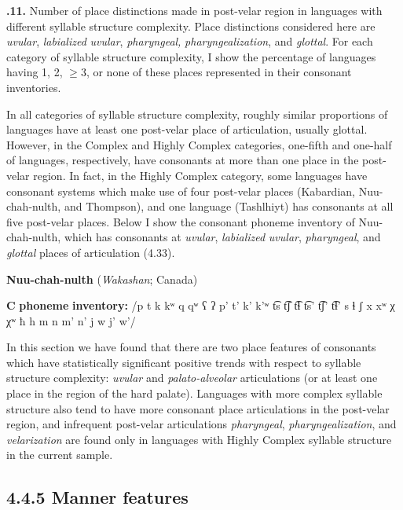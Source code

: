 \textbf{.11.} Number of place distinctions made in post-velar region in languages with different syllable structure complexity. Place distinctions considered here are \textit{uvular}, \textit{labialized} \textit{uvular}, \textit{pharyngeal,} \textit{pharyngealization}, and \textit{glottal}. For each category of syllable structure complexity, I show the percentage of languages having 1, 2, ${\geq}$3, or none of these places represented in their consonant inventories.



  In all categories of syllable structure complexity, roughly similar proportions of languages have at least one post-velar place of articulation, usually glottal. However, in the Complex and Highly Complex categories, one-fifth and one-half of languages, respectively, have consonants at more than one place in the post-velar region. In fact, in the Highly Complex category, some languages have consonant systems which make use of four post-velar places (Kabardian, Nuu-chah-nulth, and Thompson), and one language (Tashlhiyt) has consonants at all five post-velar places. Below I show the consonant phoneme inventory of Nuu-chah-nulth, which has consonants at \textit{uvular}, \textit{labialized} \textit{uvular}, \textit{pharyngeal}, and \textit{glottal} places of articulation (4.33).



\ea\label{ex:(4.33)}
  \textbf{Nuu-chah-nulth} (\textit{Wakashan}; Canada)



\textbf{C} \textbf{phoneme} \textbf{inventory:} /p t k kʷ q qʷ ʕ ʔ p’ t’ k’ k’ʷ t͡s t͡ʃ t͡ɬ t͡s’ t͡ʃ’ t͡ɬ’ s ɬ ʃ x xʷ χ χʷ ħ h m n m’ n’ j w j’ w’/

\z


  In this section we have found that there are two place features of consonants which have statistically significant positive trends with respect to syllable structure complexity: \textit{uvular} and \textit{palato-alveolar} articulations (or at least one place in the region of the hard palate). Languages with more complex syllable structure also tend to have more consonant place articulations in the post-velar region, and infrequent post-velar articulations \textit{pharyngeal}, \textit{pharyngealization}, and \textit{velarization} are found only in languages with Highly Complex syllable structure in the current sample.


\subsection{4.4.5 Manner features}

